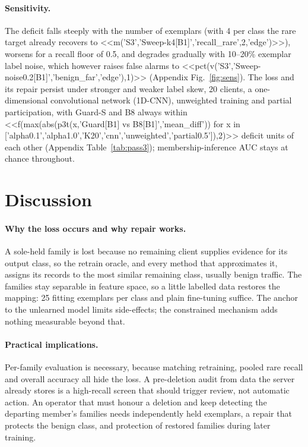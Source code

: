 \documentclass[pdflatex,sn-mathphys-num,iicol]{sn-jnl}
\begin{document}
\paragraph{Sensitivity.} The deficit falls steeply with the number of exemplars (with 4 per class the rare target already recovers to <<m('S3','Sweep-k4[B1]','recall_rare',2,'edge')>>), worsens for a recall floor of 0.5, and degrades gradually with 10--20\% exemplar label noise, which however raises false alarms to <<pct(v('S3','Sweep-noise0.2[B1]','benign_far','edge'),1)>> (Appendix Fig.~\ref{fig:sens}). The loss and its repair persist under stronger and weaker label skew, 20 clients, a one-dimensional convolutional network (1D-CNN), unweighted training and partial participation, with Guard-S and B8 always within <<f(max(abs(p3t(x,'Guard[B1] vs B8[B1]','mean_diff')) for x in ['alpha0.1','alpha1.0','K20','cnn','unweighted','partial0.5']),2)>> deficit units of each other (Appendix Table~\ref{tab:pass3}); membership-inference AUC stays at chance throughout.



\section{Discussion}\label{sec:discussion}

\paragraph{Why the loss occurs and why repair works.} A sole-held family is lost because no remaining client supplies evidence for its output class, so the retrain oracle, and every method that approximates it, assigns its records to the most similar remaining class, usually benign traffic. The families stay separable in feature space, so a little labelled data restores the mapping: 25 fitting exemplars per class and plain fine-tuning suffice. The anchor to the unlearned model limits side-effects; the constrained mechanism adds nothing measurable beyond that.

\paragraph{Practical implications.} Per-family evaluation is necessary, because matching retraining, pooled rare recall and overall accuracy all hide the loss. A pre-deletion audit from data the server already stores is a high-recall screen that should trigger review, not automatic action. An operator that must honour a deletion and keep detecting the departing member's families needs independently held exemplars, a repair that protects the benign class, and protection of restored families during later training.
\end{document}
